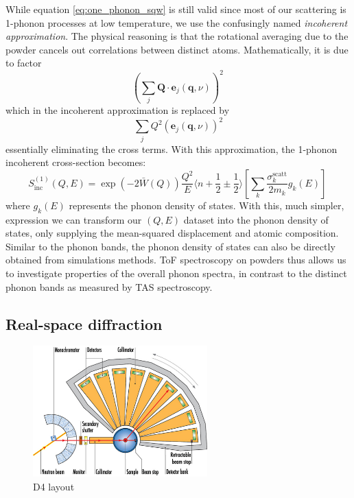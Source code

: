 While equation \ref{eq:one_phonon_sqw} is still valid since most of our scattering is 1-phonon processes at low temperature, we use the confusingly named \emph{incoherent approximation}. The physical reasoning is that the rotational averaging due to the powder cancels out correlations between distinct atoms. Mathematically, it is due to factor 
%
\[ \left( \sum_j \bm{Q} \cdot \bm{e}_j (\bm{q}, \nu) \right)^2 \, \]
%
which in the incoherent approximation is replaced by \cite{Carpenter1985}
%
\[ \sum_j  Q^2 \left( \bm{e}_j (\bm{q}, \nu) \right)^2 \]
%
essentially eliminating the cross terms. With this approximation, the 1-phonon incoherent cross-section becomes:
%
\[ S^{(1)}_{\mathrm{inc}}(Q,E) = \exp\left(-2\bar{W}(Q)\right) \frac{Q^2}{E} \langle n+\frac{1}{2}\pm\frac{1}{2} \rangle \left[ \sum_k \frac{\sigma_k^{\mathrm{scatt}}}{2m_k} g_k(E) \right]\, \]
%
where $g_k(E)$ represents the phonon density of states. With this, much simpler, expression we can transform our $(Q,E)$ dataset into the phonon density of states, only supplying the mean-squared displacement and atomic composition. Similar to the phonon bands, the phonon density of states can also be directly obtained from simulations methods. ToF spectroscopy on powders thus allows us to investigate properties of the overall phonon spectra, in contrast to the distinct phonon bands as measured by TAS spectroscopy.

\subsection{Real-space diffraction}

\begin{figure}
	\centering
	\includegraphics[width=0.6\textwidth]{fig/method/ns/d4.jpg}
	\caption[D4 layout]{D4 layout \cite{d4}}
	\label{fig:d4}
\end{figure}

